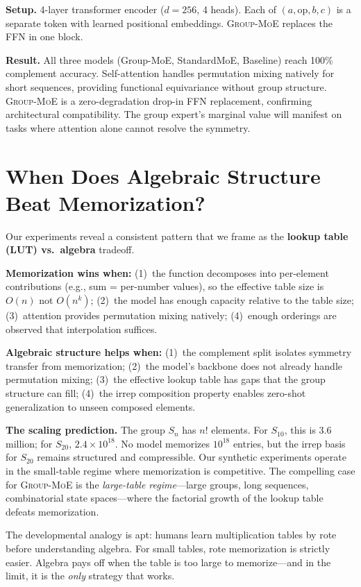 \documentclass[10pt, letterpaper]{article}
\newcommand{\gmoe}{\textsc{Group-MoE}}
\begin{document}
\textbf{Setup.} 4-layer transformer encoder ($d = 256$, 4 heads). Each of $(a, \text{op}, b, c)$ is a separate token with learned positional embeddings. \gmoe{} replaces the FFN in one block.

\textbf{Result.} All three models (Group-MoE, StandardMoE, Baseline) reach 100\% complement accuracy. Self-attention handles permutation mixing natively for short sequences, providing functional equivariance without group structure. \gmoe{} is a zero-degradation drop-in FFN replacement, confirming architectural compatibility. The group expert's marginal value will manifest on tasks where attention alone cannot resolve the symmetry.

\section{When Does Algebraic Structure Beat Memorization?}
\label{sec:analysis}

Our experiments reveal a consistent pattern that we frame as the \textbf{lookup table (LUT) vs.\ algebra} tradeoff.

\textbf{Memorization wins when:} (1)~the function decomposes into per-element contributions (e.g., sum = per-number values), so the effective table size is $O(n)$ not $O(n^k)$; (2)~the model has enough capacity relative to the table size; (3)~attention provides permutation mixing natively; (4)~enough orderings are observed that interpolation suffices.

\textbf{Algebraic structure helps when:} (1)~the complement split isolates symmetry transfer from memorization; (2)~the model's backbone does not already handle permutation mixing; (3)~the effective lookup table has gaps that the group structure can fill; (4)~the irrep composition property enables zero-shot generalization to unseen composed elements.

\textbf{The scaling prediction.} The group $S_n$ has $n!$ elements. For $S_{10}$, this is 3.6 million; for $S_{20}$, $2.4 \times 10^{18}$. No model memorizes $10^{18}$ entries, but the irrep basis for $S_{20}$ remains structured and compressible. Our synthetic experiments operate in the small-table regime where memorization is competitive. The compelling case for \gmoe{} is the \emph{large-table regime}---large groups, long sequences, combinatorial state spaces---where the factorial growth of the lookup table defeats memorization.

The developmental analogy is apt: humans learn multiplication tables by rote before understanding algebra. For small tables, rote memorization is strictly easier. Algebra pays off when the table is too large to memorize---and in the limit, it is the \emph{only} strategy that works.
\end{document}
